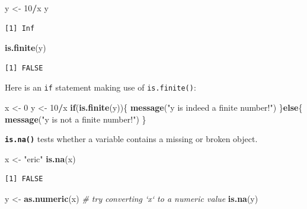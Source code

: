 \documentclass[
]{book}
\newenvironment{Shaded}{\begin{snugshade}}{\end{snugshade}}
\newcommand{\CommentTok}[1]{\textcolor[rgb]{0.56,0.35,0.01}{\textit{#1}}}
\newcommand{\ControlFlowTok}[1]{\textcolor[rgb]{0.13,0.29,0.53}{\textbf{#1}}}
\newcommand{\DecValTok}[1]{\textcolor[rgb]{0.00,0.00,0.81}{#1}}
\newcommand{\KeywordTok}[1]{\textcolor[rgb]{0.13,0.29,0.53}{\textbf{#1}}}
\newcommand{\NormalTok}[1]{#1}
\newcommand{\OperatorTok}[1]{\textcolor[rgb]{0.81,0.36,0.00}{\textbf{#1}}}
\newcommand{\StringTok}[1]{\textcolor[rgb]{0.31,0.60,0.02}{#1}}
\begin{document}
\begin{Shaded}
\begin{Highlighting}[]
\NormalTok{y <-}\StringTok{ }\DecValTok{10}\OperatorTok{/}\NormalTok{x}
\NormalTok{y}
\end{Highlighting}
\end{Shaded}

\begin{verbatim}
[1] Inf
\end{verbatim}

\begin{Shaded}
\begin{Highlighting}[]
\KeywordTok{is.finite}\NormalTok{(y)}
\end{Highlighting}
\end{Shaded}

\begin{verbatim}
[1] FALSE
\end{verbatim}

Here is an \texttt{if} statement making use of \texttt{is.finite()}:

\begin{Shaded}
\begin{Highlighting}[]
\NormalTok{x <-}\StringTok{ }\DecValTok{0}
\NormalTok{y <-}\StringTok{ }\DecValTok{10}\OperatorTok{/}\NormalTok{x}
\ControlFlowTok{if}\NormalTok{(}\KeywordTok{is.finite}\NormalTok{(y))\{}
  \KeywordTok{message}\NormalTok{(}\StringTok{"y is indeed a finite number!"}\NormalTok{)}
\NormalTok{\}}\ControlFlowTok{else}\NormalTok{\{}
  \KeywordTok{message}\NormalTok{(}\StringTok{"y is not a finite number!"}\NormalTok{)}
\NormalTok{\}}
\end{Highlighting}
\end{Shaded}

\textbf{\texttt{is.na()}} tests whether a variable contains a missing or broken object.

\begin{Shaded}
\begin{Highlighting}[]
\NormalTok{x <-}\StringTok{ "eric"}
\KeywordTok{is.na}\NormalTok{(x)}
\end{Highlighting}
\end{Shaded}

\begin{verbatim}
[1] FALSE
\end{verbatim}

\begin{Shaded}
\begin{Highlighting}[]
\NormalTok{y <-}\StringTok{ }\KeywordTok{as.numeric}\NormalTok{(x) }\CommentTok{# try converting `x` to a numeric value}
\KeywordTok{is.na}\NormalTok{(y)}
\end{Highlighting}
\end{Shaded}
\end{document}
